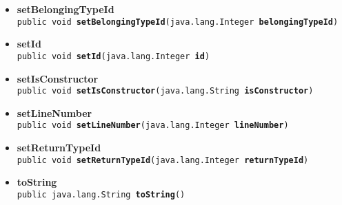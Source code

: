 {{{\begin{itemize}
{\texttt{public native int\ {\bf  hashCode}()
\label{it.unisa.sesa.repominer.db.entities.Method.hashCode()}}%
}%
\item{ 
\hypertarget{it.unisa.sesa.repominer.db.entities.Method.setBelongingTypeId(java.lang.Integer)}{{\bf  setBelongingTypeId}\\}
\texttt{public void\ {\bf  setBelongingTypeId}(\texttt{java.lang.Integer} {\bf  belongingTypeId})
\label{it.unisa.sesa.repominer.db.entities.Method.setBelongingTypeId(java.lang.Integer)}}%
}%
\item{ 
\hypertarget{it.unisa.sesa.repominer.db.entities.Method.setId(java.lang.Integer)}{{\bf  setId}\\}
\texttt{public void\ {\bf  setId}(\texttt{java.lang.Integer} {\bf  id})
\label{it.unisa.sesa.repominer.db.entities.Method.setId(java.lang.Integer)}}%
}%
\item{ 
\hypertarget{it.unisa.sesa.repominer.db.entities.Method.setIsConstructor(java.lang.String)}{{\bf  setIsConstructor}\\}
\texttt{public void\ {\bf  setIsConstructor}(\texttt{java.lang.String} {\bf  isConstructor})
\label{it.unisa.sesa.repominer.db.entities.Method.setIsConstructor(java.lang.String)}}%
}%
\item{ 
\hypertarget{it.unisa.sesa.repominer.db.entities.Method.setLineNumber(java.lang.Integer)}{{\bf  setLineNumber}\\}
\texttt{public void\ {\bf  setLineNumber}(\texttt{java.lang.Integer} {\bf  lineNumber})
\label{it.unisa.sesa.repominer.db.entities.Method.setLineNumber(java.lang.Integer)}}%
}%
\item{ 
\hypertarget{it.unisa.sesa.repominer.db.entities.Method.setReturnTypeId(java.lang.Integer)}{{\bf  setReturnTypeId}\\}
\texttt{public void\ {\bf  setReturnTypeId}(\texttt{java.lang.Integer} {\bf  returnTypeId})
\label{it.unisa.sesa.repominer.db.entities.Method.setReturnTypeId(java.lang.Integer)}}%
}%
\item{ 
\hypertarget{it.unisa.sesa.repominer.db.entities.Method.toString()}{{\bf  toString}\\}
\texttt{public java.lang.String\ {\bf  toString}()
\label{it.unisa.sesa.repominer.db.entities.Method.toString()}}%
}%
\end{itemize}
}
}
}
